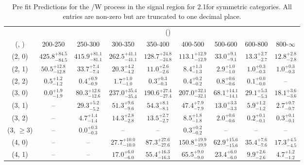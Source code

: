 \begin{table}[h!]
\tiny
\centering
\caption{Pre fit Predictions for the \ttbar/W process in the signal region for 2.1\ifb for symmetric categories. All entries are non-zero but are truncated to one decimal place.\label{tab:predsep_sig_ttw_sym}}
\begin{tabular}
{ccccccccc}
	\hline\hline
	& \multicolumn{8}{c}{\scalht (\gev)} \\ 
	 (\njet,  \nb) & 200-250 & 250-300 & 300-350 & 350-400 & 400-500 & 500-600 & 600-800 & 800-$\infty$ \\ [0.8ex] 
\hline
	(2, 0) & $425.8^{+ 84.5 }_{- 84.5 }$ & $415.9^{+ 81.1 }_{- 81.1 }$ & $262.5^{+ 41.1 }_{- 41.1 }$ & $128.7^{+ 24.8 }_{- 24.8 }$ & $113.1^{+ 12.9 }_{- 12.9 }$ & $33.0^{+ 9.1 }_{- 9.1 }$ & $13.3^{+ 2.7 }_{- 2.7 }$ & $12.8^{+ 2.8 }_{- 2.8 }$ \\[0.5ex] 
	(2, 1) & $50.5^{+ 12.8 }_{- 12.8 }$ & $33.7^{+ 7.4 }_{- 7.4 }$ & $20.3^{+ 4.2 }_{- 4.2 }$ & $11.0^{+ 2.6 }_{- 2.6 }$ & $8.4^{+ 1.3 }_{- 1.3 }$ & $2.9^{+ 1.0 }_{- 1.0 }$ & $1.0^{+ 0.3 }_{- 0.3 }$ & $1.0^{+ 0.3 }_{- 0.3 }$ \\[0.5ex] 
	(2, 2) & $0.5^{+ 1.2 }_{- 1.2 }$ & $0.4^{+ 0.9 }_{- 0.9 }$ & $1.7^{+ 1.0 }_{- 1.0 }$ & $0.3^{+ 0.3 }_{- 0.3 }$ & $0.4^{+ 0.2 }_{- 0.2 }$ & $0.8^{+ 0.6 }_{- 0.6 }$ & $0.1^{+ 0.0 }_{- 0.0 }$ & -- \\[0.5ex] 
	(3, 0) & $0.0^{+ 1.9 }_{- 1.9 }$ & $80.3^{+ 12.6 }_{- 12.6 }$ & $237.0^{+ 35.4 }_{- 35.4 }$ & $190.6^{+ 27.4 }_{- 27.4 }$ & $207.0^{+ 32.1 }_{- 32.1 }$ & $68.1^{+ 14.1 }_{- 14.1 }$ & $29.1^{+ 5.3 }_{- 5.3 }$ & $18.1^{+ 3.6 }_{- 3.6 }$ \\[0.5ex] 
	(3, 1) & -- & $29.3^{+ 5.2 }_{- 5.2 }$ & $51.3^{+ 9.6 }_{- 9.6 }$ & $54.3^{+ 8.1 }_{- 8.1 }$ & $47.4^{+ 7.9 }_{- 7.9 }$ & $13.0^{+ 3.3 }_{- 3.3 }$ & $5.9^{+ 1.2 }_{- 1.2 }$ & $2.7^{+ 0.7 }_{- 0.7 }$ \\[0.5ex] 
	(3, 2) & -- & $4.7^{+ 1.4 }_{- 1.4 }$ & $14.3^{+ 2.8 }_{- 2.8 }$ & $13.5^{+ 2.7 }_{- 2.7 }$ & $8.5^{+ 1.8 }_{- 1.8 }$ & $2.0^{+ 0.6 }_{- 0.6 }$ & $0.2^{+ 0.1 }_{- 0.1 }$ & $0.3^{+ 0.1 }_{- 0.1 }$ \\[0.5ex] 
	(3, $\ge3$) & -- & $0.0^{+ 0.3 }_{- 0.3 }$ & -- & -- & $0.3^{+ 0.2 }_{- 0.2 }$ & -- & -- & -- \\[0.5ex] 
	(4, 0) & -- & -- & $27.7^{+ 10.0 }_{- 10.0 }$ & $87.3^{+ 27.6 }_{- 27.6 }$ & $150.8^{+ 19.9 }_{- 19.9 }$ & $62.9^{+ 15.6 }_{- 15.6 }$ & $35.4^{+ 7.6 }_{- 7.6 }$ & $17.3^{+ 4.5 }_{- 4.5 }$ \\[0.5ex] 
	(4, 1) & -- & -- & $17.0^{+ 6.0 }_{- 6.0 }$ & $55.4^{+ 16.3 }_{- 16.3 }$ & $65.5^{+ 9.0 }_{- 9.0 }$ & $23.4^{+ 6.0 }_{- 6.0 }$ & $9.9^{+ 2.6 }_{- 2.6 }$ & $4.7^{+ 1.2 }_{- 1.2 }$ \\[0.5ex] 

\end{tabular}
\end{table}
